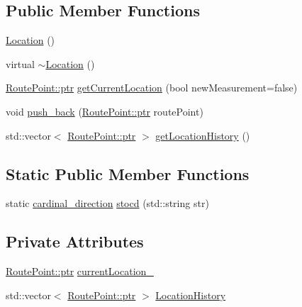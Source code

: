 \subsection*{Public Member Functions}
\begin{DoxyCompactItemize}
\item 
\hyperlink{classo_cpt_1_1_world_1_1_location_a1554685bc8b0a13c024c707113f20657}{Location} ()
\item 
virtual \hyperlink{classo_cpt_1_1_world_1_1_location_a5b1fb5e70e570eb3e0d48c49b1b7bd41}{$\sim$\+Location} ()
\item 
\hyperlink{structo_cpt_1_1_world_1_1_location_1_1_route_point_aa042feea77cb3c1531ab4e8ecf42fbd6}{Route\+Point\+::ptr} \hyperlink{classo_cpt_1_1_world_1_1_location_a91d0729340a46c306af3fa6adb61c738}{get\+Current\+Location} (bool new\+Measurement=false)
\item 
void \hyperlink{classo_cpt_1_1_world_1_1_location_aa6211993ea4e0fdf714475d22e296220}{push\+\_\+back} (\hyperlink{structo_cpt_1_1_world_1_1_location_1_1_route_point_aa042feea77cb3c1531ab4e8ecf42fbd6}{Route\+Point\+::ptr} route\+Point)
\item 
std\+::vector$<$ \hyperlink{structo_cpt_1_1_world_1_1_location_1_1_route_point_aa042feea77cb3c1531ab4e8ecf42fbd6}{Route\+Point\+::ptr} $>$ \hyperlink{classo_cpt_1_1_world_1_1_location_a4407bfcd91b7b2dd7410341521d9dcb5}{get\+Location\+History} ()
\end{DoxyCompactItemize}
\subsection*{Static Public Member Functions}
\begin{DoxyCompactItemize}
\item 
static \hyperlink{classo_cpt_1_1_world_1_1_location_aa37d99a87b49ccc38470dcc6cc64ced5}{cardinal\+\_\+direction} \hyperlink{classo_cpt_1_1_world_1_1_location_a3ed4dcf41514af703d09b5ba17589f1e}{stocd} (std\+::string str)
\end{DoxyCompactItemize}
\subsection*{Private Attributes}
\begin{DoxyCompactItemize}
\item 
\hyperlink{structo_cpt_1_1_world_1_1_location_1_1_route_point_aa042feea77cb3c1531ab4e8ecf42fbd6}{Route\+Point\+::ptr} \hyperlink{classo_cpt_1_1_world_1_1_location_ad8835274ec8b5ea13b1c01a477bafff9}{current\+Location\+\_\+}
\item 
std\+::vector$<$ \hyperlink{structo_cpt_1_1_world_1_1_location_1_1_route_point_aa042feea77cb3c1531ab4e8ecf42fbd6}{Route\+Point\+::ptr} $>$ \hyperlink{classo_cpt_1_1_world_1_1_location_a11e2d55bfa797b41b98e032f50911021}{Location\+History}
\end{DoxyCompactItemize}


